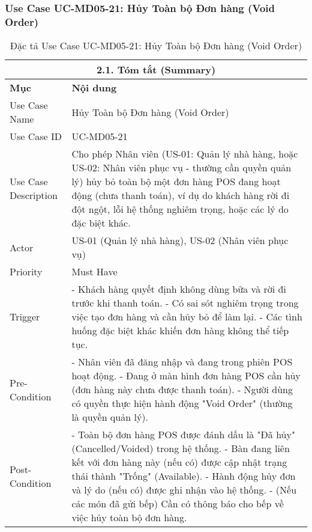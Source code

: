\subsubsection{Use Case UC-MD05-21: Hủy Toàn bộ Đơn hàng (Void Order)}
\begin{longtable}{|m{4cm}|p{11cm}|}
\caption{Đặc tả Use Case UC-MD05-21: Hủy Toàn bộ Đơn hàng (Void Order)} \label{tab:uc_md05_21_final} \\
\hline
\multicolumn{2}{|c|}{\textbf{2.1. Tóm tắt (Summary)}} \\
\hline
\textbf{Mục} & \textbf{Nội dung} \\
\hline
\endhead %
\hline
\endfoot %
\hline
\endlastfoot %
Use Case Name & Hủy Toàn bộ Đơn hàng (Void Order) \\
\hline
Use Case ID & UC-MD05-21 \\
\hline
Use Case Description & Cho phép Nhân viên (US-01: Quản lý nhà hàng, hoặc US-02: Nhân viên phục vụ - thường cần quyền quản lý) hủy bỏ toàn bộ một đơn hàng POS đang hoạt động (chưa thanh toán), ví dụ do khách hàng rời đi đột ngột, lỗi hệ thống nghiêm trọng, hoặc các lý do đặc biệt khác. \\
\hline
Actor & US-01 (Quản lý nhà hàng), US-02 (Nhân viên phục vụ) \\
\hline
Priority & Must Have \\
\hline
Trigger & - Khách hàng quyết định không dùng bữa và rời đi trước khi thanh toán. \newline - Có sai sót nghiêm trọng trong việc tạo đơn hàng và cần hủy bỏ để làm lại. \newline - Các tình huống đặc biệt khác khiến đơn hàng không thể tiếp tục. \\
\hline
Pre-Condition & - Nhân viên đã đăng nhập và đang trong phiên POS hoạt động. \newline - Đang ở màn hình đơn hàng POS cần hủy (đơn hàng này chưa được thanh toán). \newline - Người dùng có quyền thực hiện hành động "Void Order" (thường là quyền quản lý). \\
\hline
Post-Condition & - Toàn bộ đơn hàng POS được đánh dấu là "Đã hủy" (Cancelled/Voided) trong hệ thống. \newline - Bàn đang liên kết với đơn hàng này (nếu có) được cập nhật trạng thái thành "Trống" (Available). \newline - Hành động hủy đơn và lý do (nếu có) được ghi nhận vào hệ thống. \newline - (Nếu các món đã gửi bếp) Cần có thông báo cho bếp về việc hủy toàn bộ đơn hàng. \\

\end{longtable}
